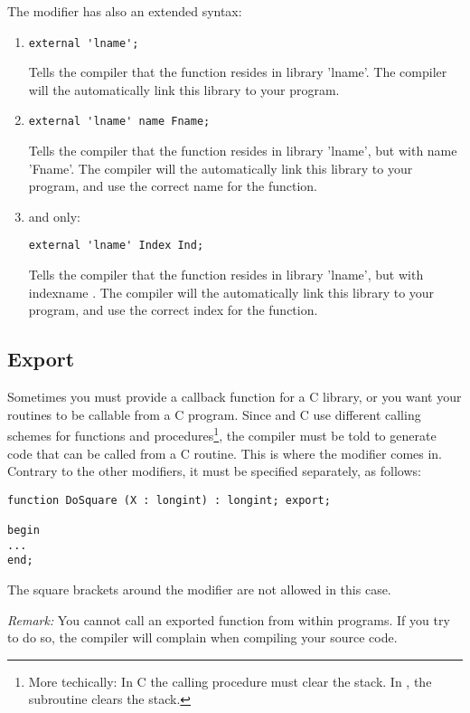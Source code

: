 \documentclass{report}
\begin{document}
The  modifier has also an extended syntax:
\begin{enumerate}
\item
\begin{verbatim}
external 'lname';
\end{verbatim}
Tells the compiler that the function resides in library 'lname'. The
compiler will the automatically link this library to your program.

\item
\begin{verbatim}
external 'lname' name Fname;
\end{verbatim}
Tells the compiler that the function resides in library 'lname', but with
name 'Fname'. The compiler will the automatically link this library to your
program, and use the correct name for the function.

\item \windows and \ostwo only:
\begin{verbatim}
external 'lname' Index Ind;
\end{verbatim}
Tells the compiler that the function resides in library 'lname', but with
indexname . The compiler will the automatically link this library to your
program, and use the correct index for the function.
\end{enumerate}

\subsection{Export}
Sometimes you must provide a callback function for a C library, or you want
your routines to be callable from a C program. Since \fpc and C use
different calling schemes for functions and procedures\footnote{More
techically: In C the calling procedure must clear the stack. In \fpc, the
subroutine clears the stack.}, the compiler must be told to generate code
that can be called from a C routine. This is where the  modifier
comes in. Contrary to the other modifiers, it must be specified separately,
as follows:
\begin{verbatim}
function DoSquare (X : longint) : longint; export;

begin
...
end;
\end{verbatim} 
The square brackets around the modifier are not allowed in this case.

{\em Remark:} You cannot call an exported function from within \fpc programs.
If you try to do so, the compiler will complain when compiling your source
code.
\end{document}
